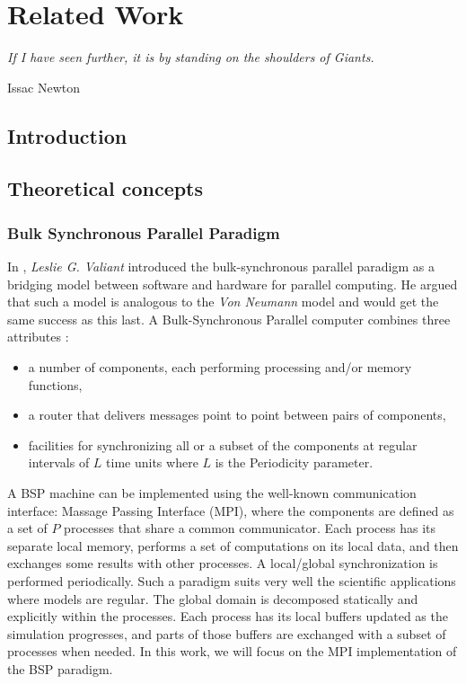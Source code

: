 \chapter{Related Work}

\epigraph{\textit{If I have seen further, it is by standing on the shoulders of Giants.}} {Issac Newton}

\newpage
\section{Introduction}
\section{Theoretical concepts}\label{Theoretical}

\subsection{Bulk Synchronous Parallel Paradigm}\label{BSP}
In \cite{valiant1990bsp}, \textit{Leslie G. Valiant} introduced the bulk-synchronous parallel paradigm as a bridging model between software and hardware for parallel computing. He argued that such a model is analogous to the \textit{Von Neumann} model and would get the same success as this last.
A Bulk-Synchronous Parallel computer combines three attributes : 
\begin{itemize}
    \item a number of components, each performing processing and/or memory functions,
    \item a router that delivers messages point to point between pairs of components,
    \item facilities for synchronizing all or a subset of the components at regular intervals of $L$ time units where $L$ is the Periodicity parameter.
\end{itemize}

A BSP machine can be implemented using the well-known communication interface: Massage Passing Interface (MPI), where the components are defined as a set of $P$ processes that share a common communicator. Each process has its separate local memory, performs a set of computations on its local data, and then exchanges some results with other processes. A local/global synchronization is performed periodically. Such a paradigm suits very well the scientific applications where models are regular. The global domain is decomposed statically and explicitly within the processes. Each process has its local buffers updated as the simulation progresses, and parts of those buffers are exchanged with a subset of processes when needed. In this work, we will focus on the MPI implementation of the BSP paradigm.

